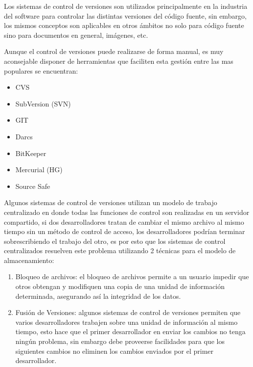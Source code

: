 Los sistemas de control de versiones son utilizados principalmente en la industria del software para controlar las distintas versiones del código fuente, sin embargo, los mismos conceptos son aplicables en otros ámbitos no solo para código fuente sino para documentos en general, imágenes, etc.

Aunque el control de versiones puede realizarse de forma manual, es muy aconsejable disponer de herramientas que faciliten esta gestión entre las mas populares se encuentran:

\begin{itemize}

	\item CVS \cite{cvs}
	\item SubVersion (SVN) \cite{svn}
	\item GIT \cite{git}
	\item Darcs \cite{darcs}
	\item BitKeeper \cite{bitkeeper}
	\item Mercurial (HG) \cite{mercurial}
	\item Source Safe \cite{ssafe}

\end{itemize}


Algunos sistemas de control de versiones utilizan un modelo de trabajo centralizado en donde todas las funciones de control son realizadas en un servidor compartido, si dos desarrolladores tratan de cambiar el mismo archivo al mismo tiempo sin un método de control de acceso, los desarrolladores podrían terminar sobrescribiendo el trabajo del otro, es por esto que los sistemas de control centralizados resuelven este problema utilizando 2 técnicas para el modelo de almacenamiento:

\begin{enumerate}

	\item Bloqueo de archivos: el bloqueo de archivos permite a un usuario impedir que otros obtengan y modifiquen una copia de una unidad de información determinada, asegurando así la integridad de los datos.
	
	\item Fusión de Versiones: algunos sistemas de control de versiones permiten que varios desarrolladores trabajen sobre una unidad de información al mismo tiempo, esto hace que el primer desarrollador en enviar los cambios no tenga ningún problema, sin embargo debe proveerse facilidades para que los siguientes cambios no eliminen los cambios enviados por el primer desarrollador.

\end{enumerate}

